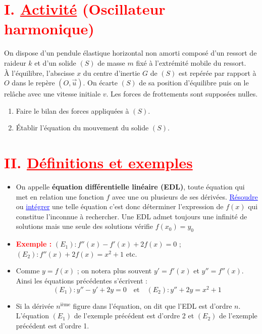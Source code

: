 \documentclass[12pt]{article}
\begin{document}
\begin{center}
\end{center}

\section*{\textcolor{red}{I. \underline{Activité} (Oscillateur harmonique)}}
On dispose d’un pendule élastique horizontal non amorti composé d’un ressort de raideur $k$ et d’un solide $(S)$ de masse $m$ fixé à l’extrémité mobile du ressort.\\
À l’équilibre, l’abscisse $x$ du centre d’inertie $G$ de $(S)$ est repérée par rapport à $O$ dans le repère $(O,\overrightarrow{u})$. On écarte $(S)$ de sa position d’équilibre puis on le relâche avec une vitesse initiale $v$. Les forces de frottements sont supposées nulles.
\begin{enumerate}
    \item Faire le bilan des forces appliquées à $(S)$.
    \item Établir l’équation du mouvement du solide $(S)$.
\end{enumerate}

\vspace{0.5cm}

\section*{\textcolor{red}{II. \underline{Définitions et exemples}}}

\begin{itemize}
    \item On appelle \textbf{équation différentielle linéaire (EDL)}, toute équation qui met en relation une fonction $f$ avec une ou plusieurs de ses dérivées. \textcolor{blue}{\underline{Résoudre}} ou \textcolor{blue}{\underline{intégrer}} une telle équation c’est donc déterminer l’expression de $f(x)$ qui constitue l’inconnue à rechercher. Une EDL admet toujours une infinité de solutions mais une seule des solutions vérifie $f(x_0)=y_0$
    
    \item \textbf{\textcolor{red}{Exemple :}} $(E_1) : f''(x) - f'(x) + 2f(x) = 0$ ; $(E_2) : f''(x) + 2f(x) = x^2 + 1$ etc.
    
    \item Comme $y = f(x)$ ; on notera plus souvent $y' = f'(x)$ et $y'' = f''(x)$.\\
    Ainsi les équations précédentes s’écrivent : 
    \[
        (E_1) : y'' - y' + 2y = 0 \quad \text{et} \quad (E_2) : y'' + 2y = x^2 + 1
    \]
    
    \item Si la dérivée $n^{\text{ième}}$ figure dans l’équation, on dit que l’EDL est d’ordre $n$.\\
    L’équation $(E_1)$ de l’exemple précédent est d’ordre 2 et $(E_2)$ de l’exemple précédent est d’ordre 1.
\end{itemize}
\end{document}

